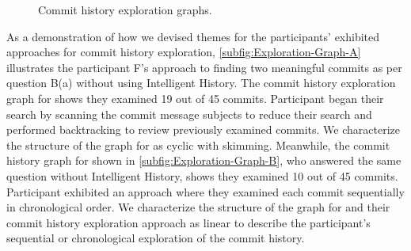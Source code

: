 \begin{figure}[h]
  \centering%
  \qquad
  \caption{
    Commit history exploration graphs.
  }%
  \label{fig:Exploration-Graphs}%
\end{figure}

As a demonstration of how we devised themes for the participants' exhibited approaches for commit history exploration, \autoref{subfig:Exploration-Graph-A} illustrates the participant F's approach to finding two meaningful commits as per question B(a) without using Intelligent History.
The commit history exploration graph for  shows they examined 19 out of 45 commits.
Participant  began their search by scanning the commit message subjects to reduce their search and performed backtracking to review previously examined commits.
We characterize the structure of the graph for  as cyclic with skimming.
Meanwhile, the commit history graph for  shown in \autoref{subfig:Exploration-Graph-B}, who answered the same question without Intelligent History, shows they examined 10 out of 45 commits.
Participant  exhibited an approach where they examined each commit sequentially in chronological order.
We characterize the structure of the graph for  and their commit history exploration approach as linear to describe the participant's sequential or chronological exploration of the commit history.

